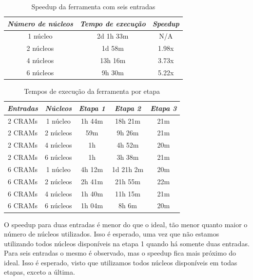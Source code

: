 \documentclass[cic,tc]{iiufrgs}
\begin{document}
\begin{table}[h]
    \caption{Speedup da ferramenta com seis entradas}
    \centering
        \begin{tabular}{c|c|c}
          \hline
          \textit{Número de núcleos}  &   \textit{Tempo de execução}  & \textit{Speedup} \\
          \hline
          \hline
          1 núcleo & 2d 1h 33m & N/A \\
          2 núcleos & 1d 58m & 1.98x \\
          4 núcleos & 13h 16m & 3.73x \\
          6 núcleos & 9h 30m & 5.22x \\
          \hline
        \end{tabular}
    \label{tbl:speedup6}
\end{table}

\begin{table}[h]
    \caption{Tempos de execução da ferramenta por etapa}
    \centering
        \begin{tabular}{c|c|c|c|c}
          \hline
          \textit{Entradas}  & \textit{Núcleos} & \textit{Etapa 1}  & \textit{Etapa 2} & \textit{Etapa 3} \\
          \hline
          \hline
          2 CRAMs & 1 núcleo  & 1h 44m &    18h 21m & 21m \\
          2 CRAMs & 2 núcleos &    59m &     9h 26m & 21m \\
          2 CRAMs & 4 núcleos & 1h     &     4h 52m & 20m \\
          2 CRAMs & 6 núcleos & 1h     &     3h 38m & 21m \\
          6 CRAMs & 1 núcleo  & 4h 12m & 1d 21h  2m & 20m \\
          6 CRAMs & 2 núcleos & 2h 41m &    21h 55m & 22m \\
          6 CRAMs & 4 núcleos & 1h 40m &    11h 15m & 21m \\
          6 CRAMs & 6 núcleos & 1h 04m &     8h  6m & 20m \\
          \hline
        \end{tabular}
    \label{tbl:stages}
\end{table}

O speedup para duas entradas é menor do que o ideal, tão menor quanto maior o
número de núcleos utilizados. Isso é esperado, uma vez que não estamos
utilizando todos núcleos disponíveis na etapa 1 quando há somente duas
entradas. Para seis entradas o mesmo é observado, mas o speedup fica mais
próximo do ideal. Isso é esperado, visto que utilizamos todos núcleos
disponíveis em todas etapas, exceto a última.
\end{document}
